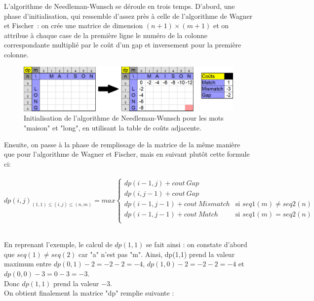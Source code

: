 \documentclass[12pt]{article}
\begin{document}
L'algorithme de Needleman-Wunsch se déroule en trois temps. D'abord, une phase d'initialisation, qui ressemble d'assez près à celle de l'algorithme de Wagner et Fischer~: on crée une matrice de dimension $(n+1)\times (m+1)$ et on attribue à chaque case de la première ligne le numéro de la colonne correspondante multiplié par le coût d'un gap et inversement pour la première colonne. \\

\begin{figure}[!h]
    \centering
    \includegraphics[scale = 0.55]{Images/Needleman/init needleman.png}
    \caption{Initialisation de l'algorithme de Needleman-Wunsch pour les mots "maison" et "long", en utilisant la table de coûts adjacente.}
    \label{fig:Matrice "dp" complète}
\end{figure}

Ensuite, on passe à la phase de remplissage de la matrice de la même manière que pour l'algorithme de Wagner et Fischer, mais en suivant plutôt cette formule ci: \\\\

$dp(i,j)_{(1,1)\leq (i,j)\leq (n,m)} = max\left\{
\begin{array}{ll}
dp(i-1,j)+cout\: Gap\\
dp(i,j-1)+cout\: Gap\\
dp(i-1,j-1) + cout\: Mismatch & \mbox{si } seq1(m)\neq seq2(n) \\
dp(i-1,j-1) + cout\: Match & \mbox{si } seq1(m) = seq2(n) \\
\end{array}
\right.$\\\\

\newpage

En reprenant l'exemple, le calcul de $dp(1,1)$ se fait ainsi : on constate d'abord que $seq(1)\neq seq(2)$ car "a" n'est pas "m". Ainsi, dp(1,1) prend la valeur maximum entre $dp(0,1)-2=-2-2=-4$, $dp(1,0)-2=-2-2=-4$ et $dp(0,0)-3=0-3=-3$.\\
Donc $dp(1,1)$ prend la valeur $-3$.\\

On obtient finalement la matrice "dp" remplie suivante :
\end{document}

